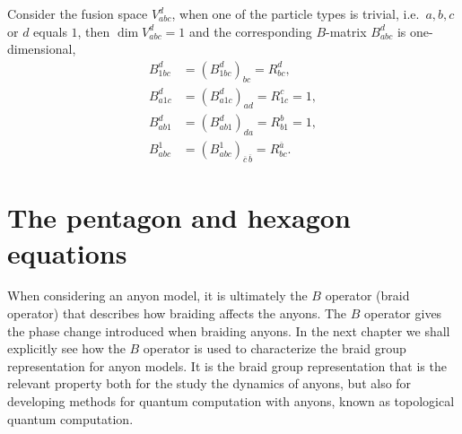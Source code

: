 \begin{lemma}\label{res:B1}
  Consider the fusion space $V_{abc}^d$, when one of the particle types is trivial, i.e.\ $a,b,c$ or $d$ equals $1$, then $\dim V_{abc}^d = 1$ and the corresponding $B$-matrix $B_{abc}^d$ is one-dimensional,
  \begin{equation}
    \begin{aligned}
      B_{1bc}^d &= \left( B_{1bc}^d \right)_{bc} = R_{bc}^d, \\
      B_{a1c}^d &= \left( B_{a1c}^d \right)_{ad} = R_{1c}^c = 1, \\
      B_{ab1}^d &= \left( B_{ab1}^d \right)_{da} = R_{b1}^b = 1, \\
      B_{abc}^1 &= \left( B_{abc}^1 \right)_{\overline{c}\,\overline{b}} = R_{bc}^{\overline{a}}.
    \end{aligned}
  \end{equation}
\end{lemma}















































\section{The pentagon and hexagon equations}\label{sec:pentagon hexagon}

When considering an anyon model, it is ultimately the $B$ operator (braid operator) that describes how braiding affects the anyons. The $B$ operator gives the phase change introduced when braiding anyons. In the next chapter we shall explicitly see how the $B$ operator is used to characterize the braid group representation for anyon models. It is the braid group representation that is the relevant property both for the study the dynamics of anyons, but also for developing methods for quantum computation with anyons, known as topological quantum computation.

